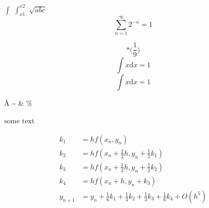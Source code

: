 \documentclass[12pt]{article}
\begin{document}
$\int$ %
$\int_{x1}^{x2}$ %
$\sqrt{abc}$ %
$$\sum_{n=1}^{\infty} 2^{-n} = 1$$ %

\begin{equation}* %
    \bigg(\frac{1}{9}\bigg)
\end{equation}
\begin{equation*} %
    \int x\textrm{d}x = 1
\end{equation*}
$$\int x\textrm{d}x = 1$$ %



\AA{}   %
\infty  %
\sim    %
\approx %
\propto %
\equiv  %
\& \%   %
\pm     %

$\textrm{some\ text}$ %


\begin{align*}
k_1 &= hf(x_n,y_n)\\
k_2 &= hf(x_n+\frac{1}{2}h,y_n+\frac{1}{2}k_1)\\
k_3 &= hf(x_n+\frac{1}{2}h,y_n+\frac{1}{2}k_2)\\
k_4 &= hf(x_n+h,y_n+k_3)\\
y_{n+1} &=
y_n+\frac{1}{6}k_1+\frac{1}{3}k_2+\frac{1}{3}k_3+\frac{1}{6}k_4+O(h^5)\\
\end{align*}

\end{document}
